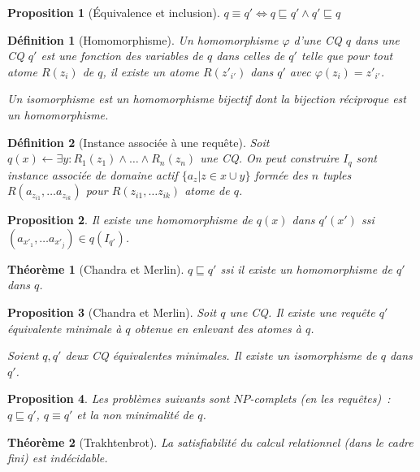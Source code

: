 \documentclass[landscape]{article}
\newcommand{\1}{\mathbbm{1}}
\newcommand{\0}{\mathbbm{0}}
\renewcommand{\phi}{\varphi}
\newtheorem{theo}{Théorème}
\newtheorem{prop}{Proposition}
\newtheorem{defi}{Définition}
\begin{document}
\begin{multicols}{2}
    \begin{prop}[Équivalence et inclusion]
        $q\equiv q' \iff q\sqsubseteq q'\wedge q'\sqsubseteq q$
    \end{prop}

    \begin{defi}[Homomorphisme]
        Un homomorphisme $\phi$ d'une CQ $q$ dans une CQ $q'$ est une fonction
        des variables de $q$ dans celles de $q'$ telle que pour tout atome
        $R(z_i)$ de $q$, il existe un atome $R(z'_{i'})$ dans $q'$ avec
        $\phi(z_i) = z'_{i'}$.

        Un isomorphisme est un homomorphisme bijectif dont la bijection réciproque
        est un homomorphisme.
    \end{defi}

    \begin{defi}[Instance associée à une requête] Soit $q(x) \leftarrow \exists y:
        R_1(z_1)\wedge\ldots\wedge R_n(z_n)$ une CQ. On peut construire $I_q$
        sont instance associée de domaine actif $\{a_z | z\in x\cup y\}$
        formée des $n$ tuples $R(a_{z_{i1}}, \ldots a_{z_{ik}})$ pour
        $R(z_{i1}, \ldots z_{ik})$ atome de $q$.
    \end{defi}

    \begin{prop} Il existe une homomorphisme de $q(x)$ dans $q'(x')$ ssi
        $(a_{x'_1}, \ldots a_{x'_j})\in q(I_{q'})$.
    \end{prop}

    \begin{theo}[Chandra et Merlin] $q\sqsubseteq q'$ ssi il existe un homomorphisme
        de $q'$ dans $q$.
    \end{theo}

    \begin{prop}[Chandra et Merlin] Soit $q$ une CQ. Il existe une requête $q'$
        équivalente minimale à $q$ obtenue en enlevant des atomes à $q$.

        Soient $q,q'$ deux CQ équivalentes minimales. Il existe un isomorphisme
        de $q$ dans $q'$.
    \end{prop}

    \begin{prop} Les problèmes suivants sont $NP$-complets (en les requêtes)~: $q\sqsubseteq q'$,
        $q \equiv q'$ et la non minimalité de $q$.
    \end{prop}

    \begin{theo}[Trakhtenbrot]
        La satisfiabilité du calcul relationnel (dans le cadre fini) est indécidable.
    \end{theo}


\end{multicols}
\end{document}
